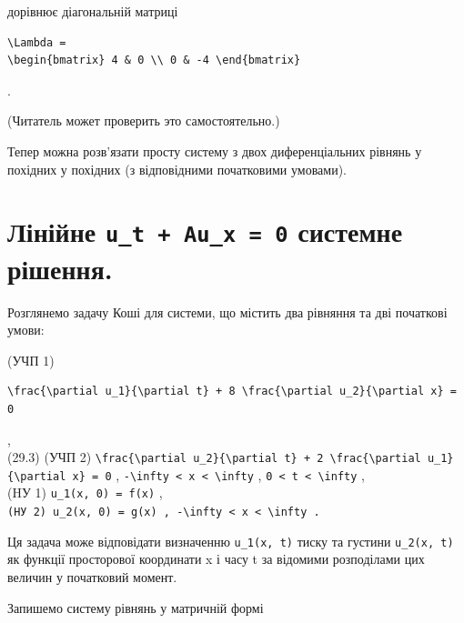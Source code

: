 \documentclass[
  ukrainian,
]{article}
\begin{document}
дорівнює діагональній матриці

\begin{verbatim}
\Lambda =
\begin{bmatrix} 4 & 0 \\ 0 & -4 \end{bmatrix}
\end{verbatim}

.

(Читатель может проверить это самостоятельно.)

Тепер можна розв'язати просту систему з двох диференціальних рівнянь у
похідних у похідних (з відповідними початковими умовами).

\section{\texorpdfstring{Лінійне \texttt{u\_t\ +\ Au\_x\ =\ 0} системне
рішення.}{Лінійне u\_t + Au\_x = 0 системне рішення.}}\label{ux43bux456ux43dux456ux439ux43dux435-u_t-au_x-0-ux441ux438ux441ux442ux435ux43cux43dux435-ux440ux456ux448ux435ux43dux43dux44f.}

Розглянемо задачу Коші для системи, що містить два рівняння та дві
початкові умови:

(УЧП 1)

\begin{verbatim}
\frac{\partial u_1}{\partial t} + 8 \frac{\partial u_2}{\partial x} = 0
\end{verbatim}

,\\
(29.3) (УЧП 2)
\texttt{\textbackslash{}frac\{\textbackslash{}partial\ u\_2\}\{\textbackslash{}partial\ t\}\ +\ 2\ \textbackslash{}frac\{\textbackslash{}partial\ u\_1\}\{\textbackslash{}partial\ x\}\ =\ 0}
,
\texttt{-\textbackslash{}infty\ \textless{}\ x\ \textless{}\ \textbackslash{}infty}
, \texttt{0\ \textless{}\ t\ \textless{}\ \textbackslash{}infty} ,\\
(HУ 1) \texttt{u\_1(x,\ 0)\ =\ f(x)} ,\\
\texttt{(HУ\ 2)\ \textquotesingle{}u\_2(x,\ 0)\ =\ g(x)\textquotesingle{}\ ,\ \textquotesingle{}-\textbackslash{}infty\ \textless{}\ x\ \textless{}\ \textbackslash{}infty\textquotesingle{}\ .}

Ця задача може відповідати визначенню \texttt{u\_1(x,\ t)} тиску та
густини \texttt{u\_2(x,\ t)} як функції просторової координати x і часу
t за відомими розподілами цих величин у початковий момент.

Запишемо систему рівнянь у матричній формі
\end{document}
